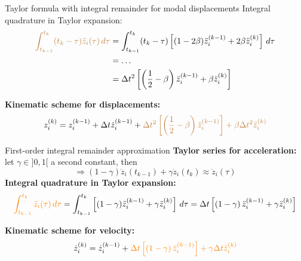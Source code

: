 \documentclass[aspectratio=169]{beamer}
\begin{document}
\begin{frame}{Taylor formula with integral remainder for modal displacements}
  Integral quadrature in Taylor expansion:
  \begin{align*}
    {\color{brown}\int_{t_{k-1}}^{t_k} (t_k - \tau) \ddot{z}_i(\tau) \, d\tau} & = \int_{t_{k-1}}^{t_k} (t_k - \tau)\left[(1 - 2\beta) \ddot{z}_i^{(k-1)} + 2\beta \ddot{z}_i^{(k)} \right]  \, d\tau \\
                                                                               & =\dots                                                                                                               \\
                                                                               & =\Delta t^2 \left[ \left( \frac{1}{2} - \beta \right) \ddot{z}_i^{(k-1)} + \beta \ddot{z}_i^{(k)}\right]
  \end{align*}
  \begin{block}{}
    \textbf{Kinematic scheme for displacements:}
    $${z}_i^{(k)}={z}_i^{(k-1)}+\Delta t \dot{z}_i^{(k-1)}+{\color{brown}\Delta t^2 \left[ \left( \frac{1}{2} - \beta \right) \ddot{z}_i^{(k-1)}\right]+\beta\Delta t^2  \ddot{z}_i^{(k)}}$$
  \end{block}
\end{frame}

\begin{frame}{First-order integral remainder approximation}
  \textbf{Taylor series for acceleration:} let $\gamma\in]0,1[$ a second constant, then
  $$ \Rightarrow (1 - \gamma) \ddot{z}_i(t_{k-1}) +\gamma \ddot{z}_i(t_k) \approx \ddot{z}_i(\tau)$$
  \textbf{Integral quadrature in Taylor expansion:}
  $$ {\color{orange}\int_{t_{k-1}}^{t_k} \ddot{z}_i(\tau) \, d\tau} = \int_{t_{k-1}}^{t_k}\left[(1 - \gamma) \ddot{z}_i^{(k-1)} + \gamma \ddot{z}_i^{(k)} \right]  \, d\tau = \Delta t \left[ \left( 1 - \gamma \right) \ddot{z}_i^{(k-1)} + \gamma \ddot{z}_i^{(k)}\right] $$
  \begin{block}{}
    \textbf{Kinematic scheme for velocity:}
    $$\dot{z}_i^{(k)}=\dot{z}_i^{(k-1)}+{\color{orange}\Delta t \left[ \left( 1-\gamma \right) \ddot{z}_i^{(k-1)}\right]+\gamma\Delta t  \ddot{z}_i^{(k)}}$$
  \end{block}
\end{frame}
\end{document}
